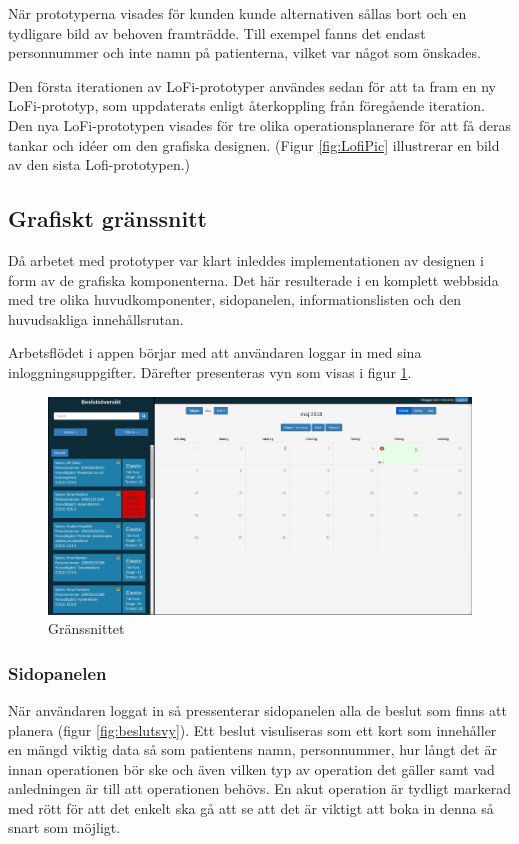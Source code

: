 När prototyperna visades för kunden kunde alternativen sållas bort och en tydligare bild av behoven framträdde.
Till exempel fanns det endast personnummer och inte namn på patienterna, vilket var något som önskades.

Den första iterationen av LoFi-prototyper användes sedan för att ta fram en ny
LoFi-prototyp, som uppdaterats enligt återkoppling från föregående iteration. Den nya LoFi-prototypen visades för tre olika operationsplanerare för att få deras tankar och idéer om den grafiska designen. (Figur \ref{fig:LofiPic} illustrerar en bild av den sista Lofi-prototypen.)

\subsection{Grafiskt gränssnitt}
Då arbetet med prototyper var klart inleddes implementationen av designen i form av de grafiska komponenterna. Det här resulterade i en komplett webbsida med tre olika huvudkomponenter, sidopanelen, informationslisten och den huvudsakliga innehållsrutan.

Arbetsflödet i appen börjar med att användaren loggar in med sina inloggningsuppgifter. Därefter presenteras vyn som visas i figur \ref{fig:window}.

\begin{figure}
	\includegraphics[width=\linewidth]{Figures/window.png}
	\caption{Gränssnittet}
	\label{fig:window}
\end{figure}


\subsubsection{Sidopanelen}
När användaren loggat in så pressenterar sidopanelen alla de beslut som finns att planera (figur \ref{fig:beslutsvy}). Ett beslut visuliseras som ett kort som innehåller en mängd viktig data så som patientens namn, personnummer, hur långt det är innan operationen bör ske och även vilken typ av operation det gäller samt vad anledningen är till att operationen behövs. En akut operation är tydligt markerad med rött för att det enkelt ska gå att se att det är viktigt att boka in denna så snart som möjligt.

